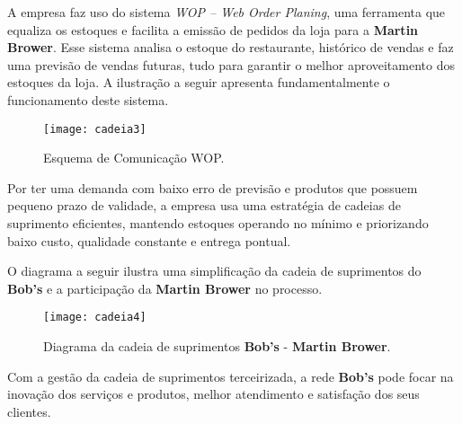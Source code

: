 		A empresa faz uso do sistema \emph{WOP – Web Order Planing}, uma ferramenta que equaliza os estoques e facilita a emissão de pedidos da loja para a \textbf{Martin Brower}. Esse sistema analisa o estoque do restaurante, histórico de vendas e faz uma previsão de vendas futuras, tudo para garantir o melhor aproveitamento dos estoques da loja. A ilustração a seguir apresenta fundamentalmente o funcionamento deste sistema. 

		\begin{figure}[h]
			\centering
			\texttt{[image: cadeia3]}
			\caption[Esquema de Comunicação WOP]{Esquema de Comunicação WOP.}
			\label{fig:cadeia3}
		\end{figure}

		Por ter uma demanda com baixo erro de previsão e produtos que possuem pequeno prazo de validade, a empresa usa uma estratégia de cadeias de suprimento eficientes, mantendo estoques operando no mínimo e priorizando baixo custo, qualidade constante e entrega pontual.	

		O diagrama a seguir ilustra uma simplificação da cadeia de suprimentos do \textbf{Bob’s} e a participação da \textbf{Martin Brower} no processo.

		\newpage
		\begin{figure}[h]
			\centering
			\texttt{[image: cadeia4]}
			\caption[Diagrama da cadeia de suprimentos Bob's - Martin Brower]{Diagrama da cadeia de suprimentos \textbf{Bob’s} - \textbf{Martin Brower}.}
			\label{fig:cadeia4}
		\end{figure}

		Com a gestão da cadeia de suprimentos terceirizada, a rede \textbf{Bob’s} pode focar na inovação dos serviços e produtos, melhor atendimento e satisfação dos seus clientes.